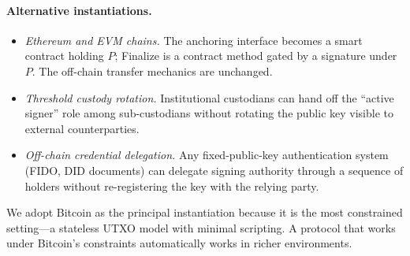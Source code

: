 \paragraph{Alternative instantiations.}
\begin{itemize}
  \item \emph{Ethereum and EVM chains.} The anchoring interface becomes a smart contract holding $P$; \textsf{Finalize} is a contract method gated by a signature under $P$. The off-chain transfer mechanics are unchanged.
  \item \emph{Threshold custody rotation.} Institutional custodians can hand off the ``active signer'' role among sub-custodians without rotating the public key visible to external counterparties.
  \item \emph{Off-chain credential delegation.} Any fixed-public-key authentication system (FIDO, DID documents) can delegate signing authority through a sequence of holders without re-registering the key with the relying party.
\end{itemize}

We adopt Bitcoin as the principal instantiation because it is the most constrained setting---a stateless UTXO model with minimal scripting. A protocol that works under Bitcoin's constraints automatically works in richer environments.
